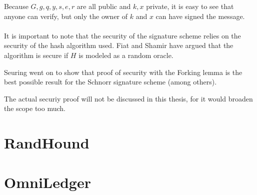Because $G,g,q,y,s,e,r$ are all public and $k,x$ private, it is easy to see that anyone can verify, but only the owner of $k$ and $x$ can have signed the message.
\\
\\
It is important to note that the security of the signature scheme relies on the security of the hash algorithm used. Fiat and Shamir have argued \cite{Oracle} that the algorithm is secure if $H$ is modeled as a random oracle.

Seuring went on to show \cite{Seuring} that proof of security with the Forking lemma is the best possible result for the Schnorr signature scheme (among others).

The actual securiy proof will not be discussed in this thesis, for it would broaden the scope too much.

\section{RandHound}


\section{OmniLedger}